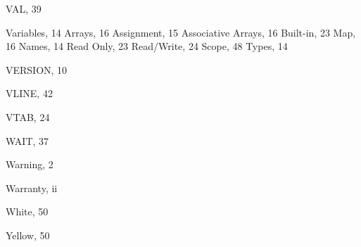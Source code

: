 \begin{theindex}
  \indexspace

  \item VAL, 39
  \item Variables, 14
    \subitem Arrays, 16
    \subitem Assignment, 15
    \subitem Associative Arrays, 16
    \subitem Built-in, 23
    \subitem Map, 16
    \subitem Names, 14
    \subitem Read Only, 23
    \subitem Read/Write, 24
    \subitem Scope, 48
    \subitem Types, 14
  \item VERSION, 10
  \item VLINE, 42
  \item VTAB, 24

  \indexspace

  \item WAIT, 37
  \item Warning, 2
  \item Warranty, ii
  \item White, 50

  \indexspace

  \item Yellow, 50

\end{theindex}
